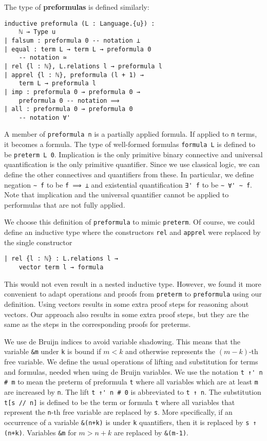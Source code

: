 \documentclass[sigplan,10pt,review, anonymous]{acmart}
\newcommand{\lil}{\lstinline}
\theoremstyle{definition}
\newcommand{\lil}{\lstinline}
\begin{document}
The type of \textbf{preformulas} is defined similarly:
\begin{lstlisting}
inductive preformula (L : Language.{u}) :
    ℕ → Type u
| falsum : preformula 0 -- notation ⊥
| equal : term L → term L → preformula 0
    -- notation ≃
| rel {l : ℕ}, L.relations l → preformula l
| apprel {l : ℕ}, preformula (l + 1) →
    term L → preformula l
| imp : preformula 0 → preformula 0 →
    preformula 0 -- notation ⟹
| all : preformula 0 → preformula 0
    -- notation ∀'
\end{lstlisting}
A member of \lil{preformula n} is a partially applied formula.
If applied to \lil{n} terms, it becomes a formula.
The type of well-formed formulas \lil{formula L} is defined to be \lil{preterm L 0}.
Implication is the only primitive binary connective and universal quantification is the only primitive quantifier. Since we use classical logic, we can define the other connectives and quantifiers from these.
In particular, we define negation \lil{∼ f} to be \lil{f ⟹ ⊥} and existential quantification \lil{∃' f} to be \lil{∼ ∀' ∼ f}.
Note that implication and the universal quantifier cannot be applied to performulas that are not fully applied.

We choose this definition of \lil{preformula} to mimic \lil{preterm}.
Of course, we could define an inductive type where the constructors \lil{rel} and \lil{apprel} were replaced by the single constructor
\begin{lstlisting}
| rel {l : ℕ} : L.relations l →
    vector term l → formula
\end{lstlisting}
This would not even result in a nested inductive type.
However, we found it more convenient to adapt operations and proofs from \lil{preterm} to \lil{preformula} using our definition.
Using vectors results in some extra proof steps for reasoning about vectors.
Our approach also results in some extra proof steps, but they are the same as the steps in the corresponding proofs for preterms.

We use de Bruijn indices to avoid variable shadowing. This means that the variable \lil{&m} under \lil{k} is bound if $m<k$ and otherwise represents the $(m-k)$-th free variable.
We define the usual operations of lifting and substitution for terms and formulas, needed when using de Bruijn variables.
We use the notation \lil{t ↑' n # m} to mean the preterm of preformula \lil{t} where all variables which are at least \lil{m} are increased by \lil{n}.
The lift \lil{t ↑' n # 0} is abbreviated to \lil{t ↑ n}.
The substitution \lil{t[s // n]} is defined to be the term or formula \lil{t} where all variables that represent the \lil{n}-th free variable are replaced by \lil{s}.
More specifically, if an occurrence of a variable \lil{&(n+k)} is under \lil{k} quantifiers, then it is replaced by \lil{s ↑ (n+k)}.
Variables \lil{&m} for $m>n+k$ are replaced by \lil{&(m-1)}.
\end{document}
